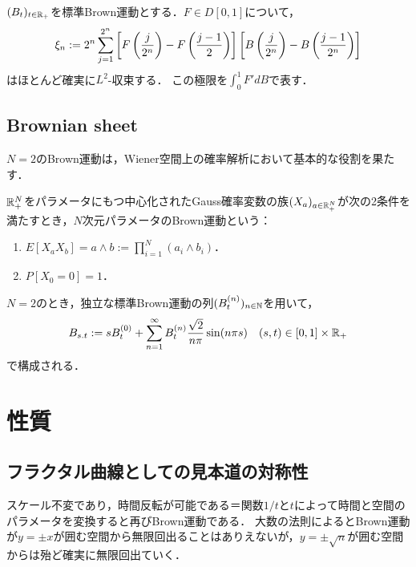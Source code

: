 \documentclass[uplatex,dvipdfmx]{jsreport}
\begin{document}
\begin{lemma}
    $(B_t)_{t\in\mathbb{R}_+}$を標準Brown運動とする．$F\in D[0,1]$について，
    \[\xi_n:=2^n\sum^{2^n}_{j=1}\left[F\left(\frac{j}{2^n}\right)-F\left(\frac{j-1}{2}\right)\right]\left[B\left(\frac{j}{2^n}\right)-B\left(\frac{j-1}{2^n}\right)\right]\]
    はほとんど確実に$L^2$-収束する．
    この極限を$\int^1_0F'dB$で表す．
\end{lemma}

\subsection{Brownian sheet}

\begin{tcolorbox}[colframe=ForestGreen, colback=ForestGreen!10!white,breakable,colbacktitle=ForestGreen!40!white,coltitle=black,fonttitle=\bfseries\sffamily,
title=]
    $N=2$のBrown運動は，Wiener空間上の確率解析において基本的な役割を果たす．
\end{tcolorbox}

\begin{definition}
    $\mathbb{R}_+^N$をパラメータにもつ中心化されたGauss確率変数の族$(X_a)_{a\in\mathbb{R}_+^N}$が次の2条件を満たすとき，$N$次元パラメータのBrown運動という：
    \begin{enumerate}
        \item $E[X_aX_b]=a\land b:=\prod_{i=1}^N(a_i\land b_i)$．
        \item $P[X_0=0]=1$．
    \end{enumerate}
\end{definition}
\begin{proposition}
    $N=2$のとき，独立な標準Brown運動の列$(B_t^{(n)})_{n\in\mathbb{N}}$を用いて，
    \[B_{s.t}:=sB_t^{(0)}+\sum_{n=1}^\infty B_t^{(n)}\frac{\sqrt{2}}{n\pi}\sin(n\pi s)\quad(s,t)\in[0,1]\times\mathbb{R}_+\]
    で構成される．
\end{proposition}

\section{性質}

\subsection{フラクタル曲線としての見本道の対称性}

\begin{tcolorbox}[colframe=ForestGreen, colback=ForestGreen!10!white,breakable,colbacktitle=ForestGreen!40!white,coltitle=black,fonttitle=\bfseries\sffamily,
title=]
    スケール不変であり，時間反転が可能である＝関数$1/t$と$t$によって時間と空間のパラメータを変換すると再びBrown運動である．
    大数の法則によるとBrown運動が$y=\pm x$が囲む空間から無限回出ることはありえないが，$y=\pm\sqrt{n}$が囲む空間からは殆ど確実に無限回出ていく．
\end{tcolorbox}
\end{document}
